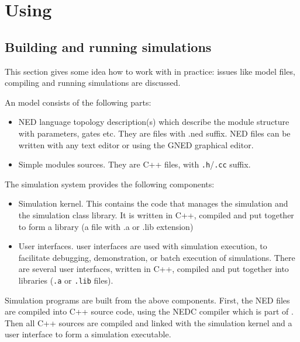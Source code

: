 \section{Using {\opp}}


\subsection{Building and running simulations}

This section gives some idea how to work with {\opp} in practice:
issues like model files, compiling and running simulations are
discussed.

An {\opp} model consists of the following parts:
\begin{itemize}
  \item{NED language topology description(s) which
    describe the module structure with parameters, gates etc. They are
    files with .ned suffix. NED files can be written with any text
    editor or using the GNED graphical editor.}
  \item{ Simple modules sources. They are C++ files, with \texttt{.h}/\texttt{.cc} suffix.}
\end{itemize}

The simulation system provides the following components:
\begin{itemize}
  \item{Simulation kernel. This contains the
    code that manages the simulation and the simulation class library.
    It is written in C++, compiled and put together to form a library
    (a file with .a or .lib extension)}
  \item{User interfaces.
     {\opp} user interfaces
    are used with simulation execution, to facilitate debugging,
    demonstration, or batch execution of simulations. There are
    several user interfaces, written in C++, compiled and put together
    into libraries (\texttt{.a} or \texttt{.lib} files).}
\end{itemize}


Simulation programs are built from the above components. First, the
NED files are compiled into C++ source code, using
the NEDC compiler which is part of {\opp}. Then
all C++ sources are compiled and linked with the simulation kernel and
a user interface to form a simulation executable.


